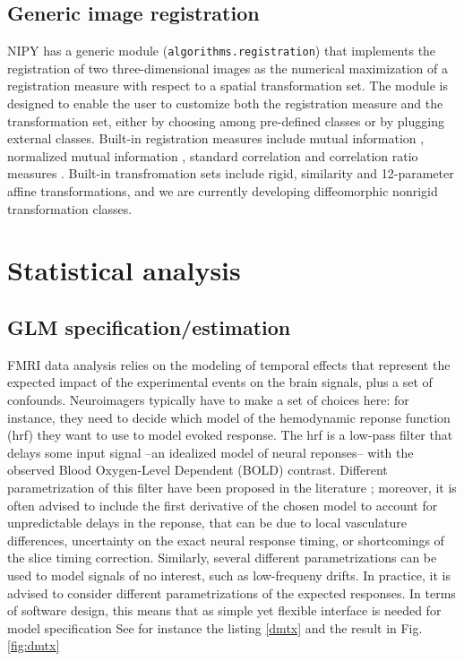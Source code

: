 \documentclass{bioinfo}
\begin{document}
\subsection{Generic image registration}

NIPY has a generic module ({\tt algorithms.registration}) that
implements the registration of two three-dimensional images as the
numerical maximization of a registration measure with respect to a
spatial transformation set. The module is designed to enable the user
to customize both the registration measure and the transformation set,
either by choosing among pre-defined classes or by plugging external
classes. Built-in registration measures include mutual information
\citep{maes:tmi:97}, normalized mutual information
\citep{studholme:pr:98}, standard correlation and correlation ratio
measures \citep{roche:ijist:00}. Built-in transfromation sets include
rigid, similarity and 12-parameter affine transformations, and we are
currently developing diffeomorphic nonrigid transformation classes.





\section{Statistical analysis}

\subsection{GLM specification/estimation}

FMRI data analysis relies on the modeling of temporal effects that
represent the expected impact of the experimental events on the brain
signals, plus a set of confounds.
%
Neuroimagers typically have to make a set of choices here: for
instance, they need to decide which model of the hemodynamic reponse
function (hrf) they want to use to model evoked response. 
%
The hrf is a low-pass filter that delays some input signal --an
idealized model of neural reponses-- with the observed Blood
Oxygen-Level Dependent (BOLD) contrast.
%
Different parametrization of this filter have been proposed in the
literature \cite{Friston1998,Glover1999}; moreover, it is often
advised to include the first derivative of the chosen model to account
for unpredictable delays in the reponse, that can be due to local
vasculature differences, uncertainty on the exact neural response
timing, or shortcomings of the slice timing correction.
%
Similarly, several different parametrizations can be used to model
signals of no interest, such as low-frequeny drifts.
%
In practice, it is advised to consider different parametrizations of
the expected responses.
% 
In terms of software design, this means that as simple yet flexible
interface is needed for model specification
See for instance the listing \ref{dmtx} and the result in
Fig. \ref{fig:dmtx}
\end{document}
